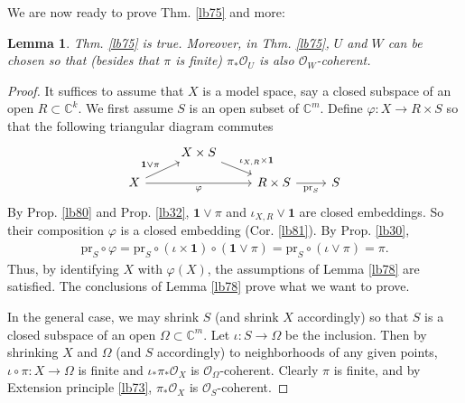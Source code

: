 \documentclass[12pt,b5paper,notitlepage]{report}
\theoremstyle{definition}
\theoremstyle{plain}
\newtheorem{lm}[df]{Lemma}
\newcommand{\id}{\mathbf{1}}
\newcommand{\scr}{\mathscr}
\newcommand{\Cbb}{\mathbb C}
\newcommand{\pr}{\mathrm {pr}}
\numberwithin{equation}{section}
\begin{document}
We are now ready to prove Thm. \ref{lb75} and more:

\begin{lm}\label{lb82}
Thm. \ref{lb75} is true. Moreover, in Thm. \ref{lb75}, $U$ and $W$ can be chosen so that (besides that $\pi$ is finite) $\pi_*\scr O_U$ is also $\scr O_W$-coherent.
\end{lm}


\begin{proof}
It suffices to assume that $X$ is a model space, say a closed subspace of an open $R\subset\Cbb^k$. We first assume $S$ is an open subset of $\Cbb^m$. Define $\varphi:X\rightarrow R\times S$ so that the following triangular diagram commutes
\begin{equation*}
\begin{tikzcd}[row sep=small]
                        & X\times S \arrow[rd,"\iota_{X,R}\times\id"] &                     &   \\
X \arrow[ru,"\id\vee\pi"] \arrow[rr,"\varphi"'] &                      & R\times S \arrow[r,"\pr_S"'] & S
\end{tikzcd}
\end{equation*}
By Prop. \ref{lb80} and Prop. \ref{lb32}, $\id\vee\pi$ and $\iota_{X,R}\vee\id$ are closed embeddings. So their composition $\varphi$ is a closed embedding (Cor. \ref{lb81}). By Prop. \ref{lb30},
\begin{align*}
\pr_S\circ\varphi=\pr_S\circ(\iota\times\id)\circ(\id\vee\pi)=\pr_S\circ (\iota\vee\pi)=\pi.
\end{align*}
Thus, by identifying $X$ with $\varphi(X)$, the assumptions of Lemma \ref{lb78} are satisfied. The conclusions of Lemma \ref{lb78} prove what we want to prove.

In the general case, we may shrink $S$ (and shrink $X$ accordingly) so that $S$ is a closed subspace of an open $\Omega\subset\Cbb^m$. Let $\iota:S\rightarrow\Omega$ be the inclusion. Then by shrinking $X$ and $\Omega$ (and $S$ accordingly) to neighborhoods of any given points, $\iota\circ\pi:X\rightarrow\Omega$ is finite and $\iota_*\pi_*\scr O_X$ is $\scr O_\Omega$-coherent. Clearly $\pi$ is finite, and by Extension principle \ref{lb73}, $\pi_*\scr O_X$ is $\scr O_S$-coherent.
\end{proof}
\end{document}
